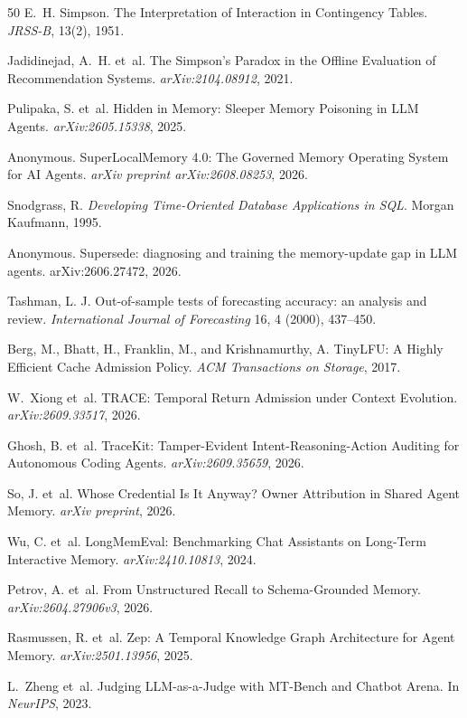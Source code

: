 \documentclass[sigconf,nonacm]{acmart}
\begin{document}
\begin{thebibliography}{50}
E.~H. Simpson.
\newblock The Interpretation of Interaction in Contingency Tables.
\newblock \emph{JRSS-B}, 13(2), 1951.

Jadidinejad, A.~H. et~al.
\newblock The Simpson's Paradox in the Offline Evaluation of Recommendation Systems.
\newblock \emph{arXiv:2104.08912}, 2021.

Pulipaka, S. et~al.
\newblock Hidden in Memory: Sleeper Memory Poisoning in LLM Agents. \newblock \emph{arXiv:2605.15338}, 2025.

Anonymous.
\newblock SuperLocalMemory 4.0: The Governed Memory Operating System for AI Agents.
\newblock \emph{arXiv preprint arXiv:2608.08253}, 2026.

Snodgrass, R.
\newblock \emph{Developing Time-Oriented Database Applications in SQL}.
\newblock Morgan Kaufmann, 1995.

Anonymous. Supersede: diagnosing and training the memory-update gap in LLM
agents. arXiv:2606.27472, 2026.

Tashman, L. J. Out-of-sample tests of forecasting accuracy: an analysis and review. \emph{International Journal of Forecasting} 16, 4 (2000), 437--450.

Berg, M., Bhatt, H., Franklin, M., and Krishnamurthy, A.
\newblock TinyLFU: A Highly Efficient Cache Admission Policy.
\newblock \emph{ACM Transactions on Storage}, 2017.

W.~Xiong et~al.
\newblock TRACE: Temporal Return Admission under Context Evolution. \newblock \emph{arXiv:2609.33517}, 2026.

Ghosh, B. et~al.
\newblock TraceKit: Tamper-Evident Intent-Reasoning-Action Auditing for Autonomous Coding Agents.
\newblock \emph{arXiv:2609.35659}, 2026.

So, J. et~al.
\newblock Whose Credential Is It Anyway? Owner Attribution in Shared Agent Memory.
\newblock \emph{arXiv preprint}, 2026.

Wu, C. et~al.
\newblock LongMemEval: Benchmarking Chat Assistants on Long-Term Interactive Memory. \newblock \emph{arXiv:2410.10813}, 2024.

Petrov, A. et~al.
\newblock From Unstructured Recall to Schema-Grounded Memory.
\newblock \emph{arXiv:2604.27906v3}, 2026.

Rasmussen, R. et~al.
\newblock Zep: A Temporal Knowledge Graph Architecture for Agent Memory.
\newblock \emph{arXiv:2501.13956}, 2025.

L.~Zheng et~al.
\newblock Judging LLM-as-a-Judge with MT-Bench and Chatbot Arena.
\newblock In \emph{NeurIPS}, 2023.

\end{thebibliography}
\end{document}
